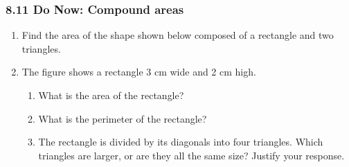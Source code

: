 \documentclass[12pt, twoside]{article}
\begin{document}
\subsubsection*{8.11 Do Now: Compound areas}
 \begin{enumerate}
  \item Find the area of the shape shown below composed of a rectangle and two triangles.
    \begin{flushright}
  \end{flushright} \vspace{1cm}
  
  \item The figure shows a rectangle 3 cm wide and 2 cm high.
  \begin{center}
  \end{center}
    \begin{enumerate}
      \item What is the area of the rectangle? \vspace{2.5cm}
      \item What is the perimeter of the rectangle? \vspace{2.5cm}
      \item The rectangle is divided by its diagonals into four triangles. Which triangles are larger, or are they all the same size? Justify your response. \vspace{2cm}
    \end{enumerate}


\end{enumerate}
\end{document}

